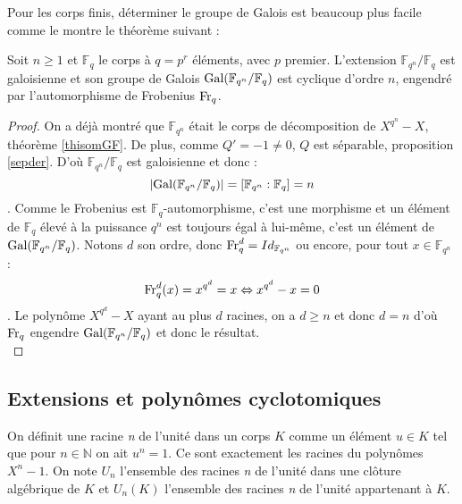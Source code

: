 \documentclass[a4paper]{article} %
\numberwithin{section}{part}
\numberwithin{equation}{section}
\newcommand\nroot[1]{\textit{#1}\up{\textit{ième}}}
\newcommand\GF[1]{\mathbb{F}_{#1}}
\begin{document}
Pour les corps finis, déterminer le groupe de Galois est beaucoup plus facile
comme le montre le théorème suivant :

\begin{thm}
Soit $n\geq1$ et $\GF{q}$ le corps à $q=p^r$ éléments, avec $p$ premier.
L'extension $\GF{q^n}/\GF{q}$ est galoisienne et son groupe de Galois
$\textup{Gal}(\GF{q^n}/\GF{q})$ est cyclique d'ordre $n$, engendré par 
l'automorphisme de Frobenius $\textup{Fr}_q$.
\end{thm}
\begin{proof}
On a déjà montré que $\GF{q^n}$ était le corps de décomposition de $X^{q^n} -
X$, théorème \ref{thisomGF}. De plus, comme $Q' = -1 \neq 0$, $Q$ est séparable,
proposition \ref{sepder}. D'où $\GF{q^n}/\GF{q}$ est galoisienne et donc :
\[|\textup{Gal}(\GF{q^n}/\GF{q})| = [\GF{q^n}:\GF{q}] = n\].
Comme le Frobenius est $\GF{q}$-automorphisme, c'est une morphisme et un élément
de $\GF{q}$ élevé à la puissance $q^n$ est toujours égal à lui-même, c'est un
élément de $\textup{Gal}(\GF{q^n}/\GF{q})$. Notons $d$ son ordre, donc
$\textup{Fr}_q^d = Id_{\GF{q^n}}$ ou encore, pour tout $x\in\GF{q^n}$ :
\[\textup{Fr}_q^d(x) = x^{q^d} = x \Leftrightarrow x^{q^d} - x = 0\].
Le polynôme $X^{q^d} - X$ ayant au plus $d$ racines, on a $d\geq n$ et donc $d =
n$ d'où $\textup{Fr}_q$ engendre $\textup{Gal}(\GF{q^n}/\GF{q})$ et donc le
résultat.\\
\end{proof}

\subsection{Extensions et polynômes cyclotomiques}
On définit une racine \nroot{n} de l'unité dans un corps $K$ 
comme un élément $u\in K$ tel que pour $n\in\mathbb{N}$ on ait $u^n = 1$. Ce 
sont exactement les racines du polynômes $X^n - 1$.
On note $U_n$ l'ensemble des racines \nroot{n} de l'unité dans une clôture 
algébrique de $K$ et $U_n(K)$ l'ensemble des racines \nroot{n} de l'unité 
appartenant à $K$.
\end{document}
